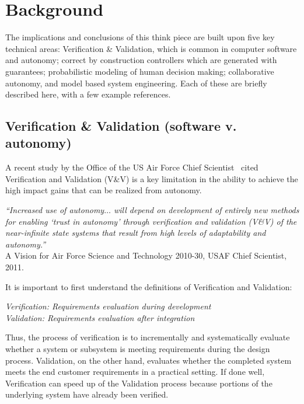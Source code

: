 
\section*{Background}

The implications and conclusions of this think piece are built upon five key technical areas: Verification \& Validation, which is common in computer software and autonomy; correct by construction controllers which are generated with guarantees; probabilistic modeling of human decision making; collaborative autonomy, and model based system engineering. Each of these are briefly described here, with a few example references. 

\subsection*{Verification \& Validation (software v. autonomy)}

A recent study by the Office of the US Air Force Chief Scientist~\cite{tech-horizons2011} cited Verification and Validation (V\&V) is a key limitation in the ability to achieve the high impact gains that can be realized from autonomy. 
\begin{center}
\parbox[c]{6in}{
{\em ``Increased use of autonomy$\ldots$  will depend on development of entirely new methods for enabling `trust in autonomy' through verification and validation (V\&V) of the near-infinite state systems that result from high levels of adaptability and autonomy.''} \\
\hspace*{20pt} A Vision for Air Force Science and Technology 2010-30, USAF Chief Scientist, 2011.
}
\end{center}

It is important to first understand the definitions of Verification and Validation:
\begin{center}
\parbox[c]{6in}{
{\em Verification: Requirements evaluation {\em during} development} \\[0.1 in]
{\em Validation: Requirements evaluation {\em after} integration} %
}
\end{center}
Thus, the process of verification is to incrementally and systematically evaluate whether a system or subsystem is meeting requirements during the design process. Validation, on the other hand, evaluates whether the completed system meets the end customer requirements in a practical setting. If done well, Verification can speed up of the Validation process because portions of the underlying system have already been verified. 

